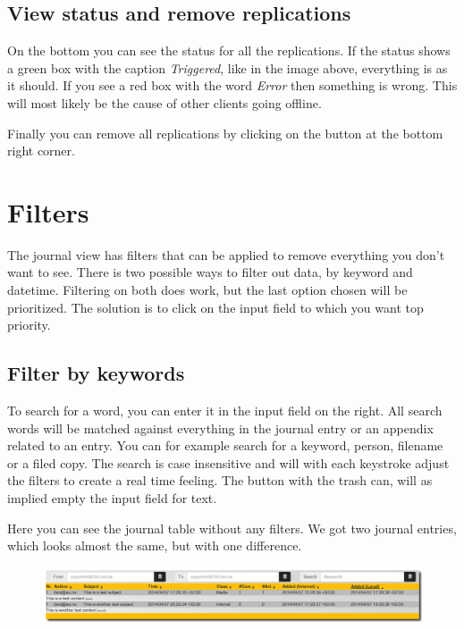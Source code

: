 \documentclass[letterpaper,10pt,english]{sphinxmanual}
\begin{document}
\subsection{View status and remove replications}
\label{User manual:view-status-and-remove-replications}
On the bottom you can see the status for all the replications. If the status shows a green box with the caption \emph{Triggered}, like in the image above, everything is as it should. If you see a red box with the word \emph{Error} then something is wrong. This will most likely be the cause of other clients going offline.

Finally you can remove all replications by clicking on the button at the bottom right corner.


\section{Filters}
\label{User manual:filters}
The journal view has filters that can be applied to remove everything you don’t want to see.
There is two possible ways to filter out data, by keyword and datetime. Filtering on both does work, but the last option chosen will be prioritized. The solution is to click on the input field to which you want top priority.


\subsection{Filter by keywords}
\label{User manual:filter-by-keywords}
To search for a word, you can enter it in the input field on the right. All search words will be matched against everything in the journal entry or an appendix related to an entry. You can for example search for a keyword, person, filename or a filed copy. The search is case insensitive and will with each keystroke adjust the filters to create a real time feeling. The button with the trash can, will as implied empty the input field for text.

Here you can see the journal table without any filters. We got two journal entries, which looks almost the same, but with one difference.
\begin{figure}[htbp]
\centering

\includegraphics{filter2.png}
\end{figure}
\end{document}
